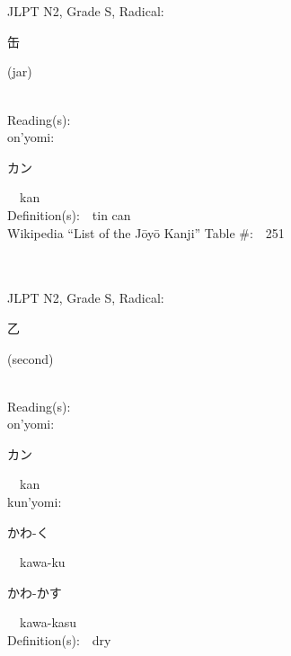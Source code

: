 \begin{multicols}{2}
\ \ \\
{\fontsize{34pt}{40pt}  }\ \ \\  %
{JLPT N2, Grade S, Radical:\ \ {\begin{CJK}{UTF8}{min} 缶 \end{CJK}} (jar) } \\
Reading(s):\ \ \\
{\hspace*{1em}}on'yomi:\ \ \\
{\hspace*{2em}}{\begin{CJK}{UTF8}{min} カン \end{CJK}}\ \ kan\ \ \\
Definition(s):\ \ tin can \\
Wikipedia ``List of the J\=oy\=o Kanji'' Table \#:\ \ 251 \\
\ \ \\
{\fontsize{34pt}{40pt}  }\ \ \\  %
{JLPT N2, Grade S, Radical:\ \ {\begin{CJK}{UTF8}{min} 乙 \end{CJK}} (second) } \\
Reading(s):\ \ \\
{\hspace*{1em}}on'yomi:\ \ \\
{\hspace*{2em}}{\begin{CJK}{UTF8}{min} カン \end{CJK}}\ \ kan\ \ \\
{\hspace*{1em}}kun'yomi:\ \ \\
{\hspace*{2em}}{\begin{CJK}{UTF8}{min} かわ-く \end{CJK}}\ \ kawa-ku\ \ \\
{\hspace*{2em}}{\begin{CJK}{UTF8}{min} かわ-かす \end{CJK}}\ \ kawa-kasu\ \ \\
Definition(s):\ \ dry \\

\end{multicols}
